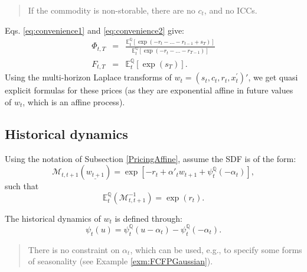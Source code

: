 \documentclass[
  12pt,
]{book}
\theoremstyle{definition}
\theoremstyle{definition}
\theoremstyle{definition}
\theoremstyle{definition}
\theoremstyle{remark}
\begin{document}
\begin{quote}
If the commodity is non-storable, there are no \(c_t\), and no ICCs.
\end{quote}

Eqs. \eqref{eq:convenience1} and \eqref{eq:convenience2} give:
\begin{eqnarray*}
\Phi_{t,T} & = & \frac{\mathbb{E}^{\mathbb{Q}}_t [\exp (-r_t - \ldots - r_{t-1} + s_T)]}{\mathbb{E}^{\mathbb{Q}}_t [\exp (-r_t - \ldots - r_{T-1})]} \\
F_{t,T} & = & \mathbb{E}^{\mathbb{Q}}_t [\exp (s_T)].
\end{eqnarray*}
Using the multi-horizon Laplace transforms of \(w_t = (s_t, c_t, r_t, x^{'}_t)'\), we get quasi explicit formulas for these prices (as they are exponential affine in future values of \(w_t\), which is an affine process).

\hypertarget{historical-dynamics}{%
\subsection{Historical dynamics}\label{historical-dynamics}}

Using the notation of Subsection \ref{PricingAffine}, assume the SDF is of the form:
\[
\mathcal{M}_{t,t+1} (\underline{w_{t+1}}) = \exp \left[-r_t + \alpha'_t w_{t+1} + \psi^{\mathbb{Q}}_t (-\alpha_t)\right],
\]
such that
\[
\mathbb{E}^{\mathbb{Q}}_t (\mathcal{M}_{t,t+1}^{-1}) = \exp (r_t).
\]

The historical dynamics of \(w_t\) is defined through:
\[
\psi_t (u) = \psi^{\mathbb{Q}}_t (u-\alpha_t) - \psi^{\mathbb{Q}}_t(-\alpha_t).
\]

\begin{quote}
There is no constraint on \(\alpha_t\), which can be used, e.g., to specify some forms of seasonality (see Example \ref{exm:FCFPGaussian}).
\end{quote}
\end{document}

